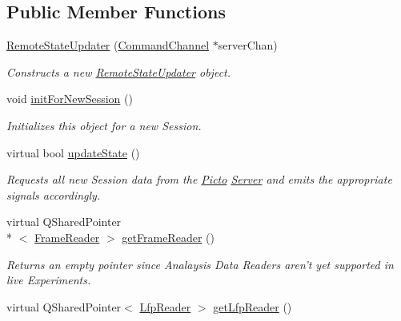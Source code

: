 \subsection*{Public Member Functions}
\begin{DoxyCompactItemize}
\item 
\hyperlink{class_picto_1_1_remote_state_updater_a349658dd465ee16e00d5d68ad245aae1}{Remote\-State\-Updater} (\hyperlink{class_picto_1_1_command_channel}{Command\-Channel} $\ast$server\-Chan)
\begin{DoxyCompactList}\small\item\em Constructs a new \hyperlink{class_picto_1_1_remote_state_updater}{Remote\-State\-Updater} object. \end{DoxyCompactList}\item 
void \hyperlink{class_picto_1_1_remote_state_updater_a425e1dd79379c413e0b3584e1a13ae7e}{init\-For\-New\-Session} ()
\begin{DoxyCompactList}\small\item\em Initializes this object for a new Session. \end{DoxyCompactList}\item 
virtual bool \hyperlink{class_picto_1_1_remote_state_updater_ac1b44f60204ce0ec535b226175deb8db}{update\-State} ()
\begin{DoxyCompactList}\small\item\em Requests all new Session data from the \hyperlink{namespace_picto}{Picto} \hyperlink{class_server}{Server} and emits the appropriate signals accordingly. \end{DoxyCompactList}\item 
\hypertarget{class_picto_1_1_remote_state_updater_ac3dbd773523c5775ddbeb6f49bee4a9b}{virtual Q\-Shared\-Pointer\\*
$<$ \hyperlink{class_picto_1_1_frame_reader}{Frame\-Reader} $>$ \hyperlink{class_picto_1_1_remote_state_updater_ac3dbd773523c5775ddbeb6f49bee4a9b}{get\-Frame\-Reader} ()}\label{class_picto_1_1_remote_state_updater_ac3dbd773523c5775ddbeb6f49bee4a9b}

\begin{DoxyCompactList}\small\item\em Returns an empty pointer since Analaysis Data Readers aren't yet supported in live Experiments. \end{DoxyCompactList}\item 
\hypertarget{class_picto_1_1_remote_state_updater_a34bdfb3310d0c3d6a814a4eaf140a774}{virtual Q\-Shared\-Pointer$<$ \hyperlink{class_picto_1_1_lfp_reader}{Lfp\-Reader} $>$ \hyperlink{class_picto_1_1_remote_state_updater_a34bdfb3310d0c3d6a814a4eaf140a774}{get\-Lfp\-Reader} ()}\label{class_picto_1_1_remote_state_updater_a34bdfb3310d0c3d6a814a4eaf140a774}


\end{DoxyCompactItemize}
